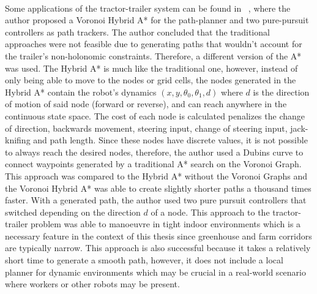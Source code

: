\paragraph{}Some applications of the tractor-trailer system can be found in ~\cite{theman}, 
where the author proposed a Voronoi Hybrid A* for the path-planner and two pure-pursuit controllers 
as path trackers. The author concluded that the traditional approaches were not feasible due 
to generating paths that wouldn't account for the trailer's non-holonomic constraints. Therefore, 
a different version of the A* was used. The Hybrid A* is much like the traditional one, however, 
instead of only being able to move to the nodes or grid cells, the nodes generated in the Hybrid A* 
contain the robot's dynamics $(x,y,\theta_0,\theta_1,d)$ where $d$ is the direction of motion of said 
node (forward or reverse), and can reach anywhere in the continuous state space. The cost of each 
node is calculated penalizes the change of direction, backwards movement, steering input, change of 
steering input, jack-knifing and path length. Since these nodes have discrete values, it is not 
possible to always reach the desired nodes, therefore, the author used a Dubins curve to connect 
waypoints generated by a traditional A* search on the Voronoi Graph. This approach was compared to the Hybrid A* without 
the Voronoi Graphs and the Voronoi Hybrid A* was able to create slightly shorter paths a thousand times 
faster. With a generated path, the author used two pure pursuit controllers that switched depending on the 
direction $d$ of a node. This approach to the tractor-trailer problem was able to manoeuvre in 
tight indoor environments which is a necessary feature in the context of this thesis since greenhouse 
and farm corridors are typically narrow. This approach is also successful because it takes a relatively 
short time to generate a smooth path, however, it does not include a local planner for dynamic environments which 
may be crucial in a real-world scenario where workers or other robots may be present.

